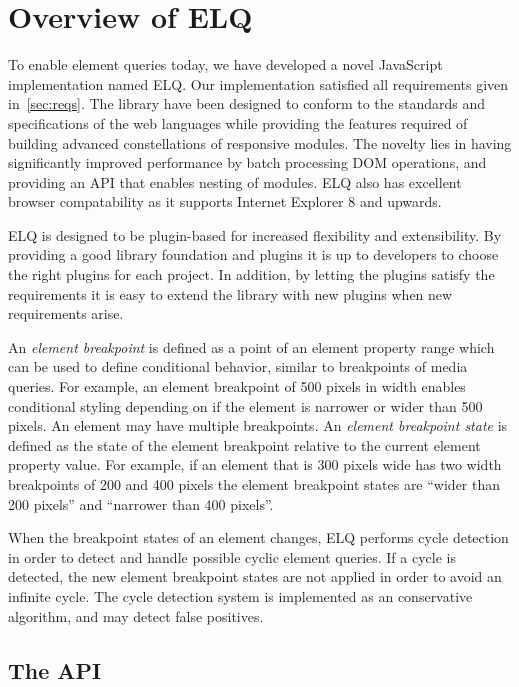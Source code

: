 \documentclass{acm_proc_article-sp}
\newcommand{\elq}{ELQ}
\begin{document}
\section{Overview of \elq{}}
  To enable element queries today, we have developed a novel JavaScript implementation named \elq{}.
  Our implementation satisfied all requirements given in~\ref{sec:reqs}.
  The library have been designed to conform to the standards and specifications of the web languages while providing the features required of building advanced constellations of responsive modules.
  The novelty lies in having significantly improved performance by batch processing DOM operations, and providing an API that enables nesting of modules.
  \elq{} also has excellent browser compatability as it supports Internet Explorer 8 and upwards.

  \elq{} is designed to be plugin-based for increased flexibility and extensibility.
  By providing a good library foundation and plugins it is up to developers to choose the right plugins for each project.
  In addition, by letting the plugins satisfy the requirements it is easy to extend the library with new plugins when new requirements arise.

  An \emph{element breakpoint} is defined as a point of an element property range which can be used to define conditional behavior, similar to breakpoints of media queries.
  For example, an element breakpoint of 500 pixels in width enables conditional styling depending on if the element is narrower or wider than 500 pixels.
  An element may have multiple breakpoints.
  An \emph{element breakpoint state} is defined as the state of the element breakpoint relative to the current element property value.
  For example, if an element that is 300 pixels wide has two width breakpoints of 200 and 400 pixels the element breakpoint states are ``wider than 200 pixels'' and ``narrower than 400 pixels''.

  When the breakpoint states of an element changes, \elq{} performs cycle detection in order to detect and handle possible cyclic element queries.
  If a cycle is detected, the new element breakpoint states are not applied in order to avoid an infinite cycle.
  The cycle detection system is implemented as an conservative algorithm, and may detect false positives.

  \subsection{The API}\label{sec:elq-api}
\end{document}
